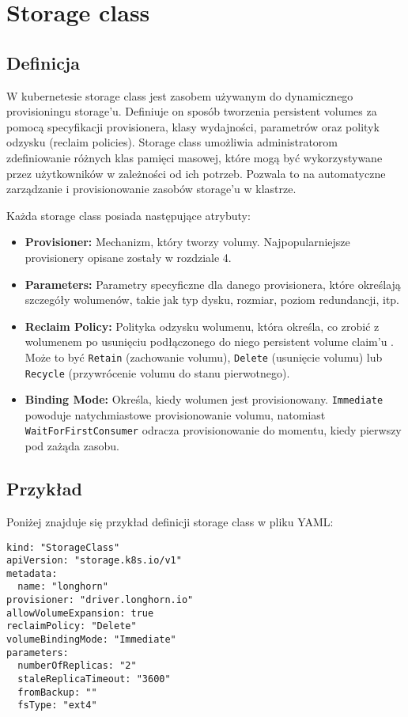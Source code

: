 \documentclass[polish,envcountsect,10pt]{article}
\begin{document}
\section{Storage class}

\subsection{Definicja}

W kubernetesie storage class jest zasobem używanym do dynamicznego provisioningu storage'u. Definiuje on sposób tworzenia persistent volumes za pomocą specyfikacji provisionera, klasy wydajności, parametrów oraz polityk odzysku (reclaim policies). Storage class umożliwia administratorom zdefiniowanie różnych klas pamięci masowej, które mogą być wykorzystywane przez użytkowników w zależności od ich potrzeb. Pozwala to na automatyczne zarządzanie i provisionowanie zasobów storage'u w klastrze.

\noindent Każda storage class posiada następujące atrybuty:
\begin{itemize}
    \item \textbf{Provisioner:} Mechanizm, który tworzy volumy. Najpopularniejsze provisionery opisane zostały w rozdziale 4.
    \item \textbf{Parameters:} Parametry specyficzne dla danego provisionera, które określają szczegóły wolumenów, takie jak typ dysku, rozmiar, poziom redundancji, itp.
	\item \textbf{Reclaim Policy:} Polityka odzysku  wolumenu, która określa, co zrobić z wolumenem po usunięciu podłączonego do niego persistent volume claim'u . Może to być \texttt{Retain} (zachowanie volumu), \texttt{Delete} (usunięcie volumu) lub \texttt{Recycle} (przywrócenie volumu do stanu pierwotnego).
	\item \textbf{Binding Mode:} Określa, kiedy wolumen jest provisionowany. \texttt{Immediate} powoduje natychmiastowe provisionowanie volumu, natomiast \texttt{WaitForFirstConsumer} odracza provisionowanie do momentu, kiedy pierwszy pod zażąda zasobu.
\end{itemize}

\subsection{Przykład}

Poniżej znajduje się przykład definicji storage class w pliku YAML:

\begin{verbatim}
kind: "StorageClass"
apiVersion: "storage.k8s.io/v1"
metadata:
  name: "longhorn"
provisioner: "driver.longhorn.io"
allowVolumeExpansion: true
reclaimPolicy: "Delete"
volumeBindingMode: "Immediate"
parameters:
  numberOfReplicas: "2"
  staleReplicaTimeout: "3600"
  fromBackup: ""
  fsType: "ext4"
\end{verbatim}
\end{document}
